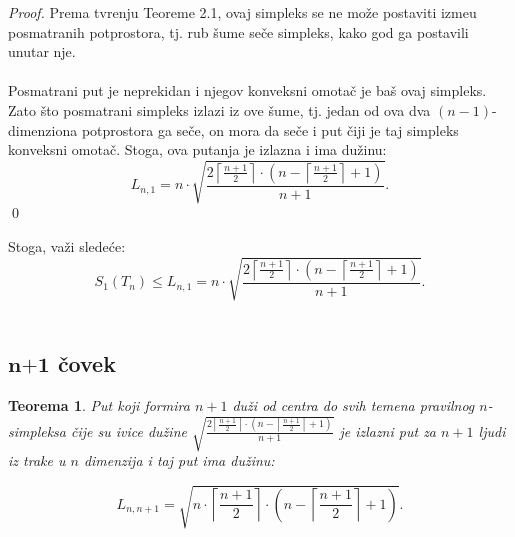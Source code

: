 \documentclass[11pt]{article}
\newtheorem{teo}{\bf Teorema}[section]
\begin{document}
\begin{proof}
Prema tvr\dj enju Teoreme 2.1, ovaj simpleks se ne mo\v ze postaviti izme\dj u posmatranih potprostora, tj. rub \v sume se\v ce simpleks, kako god ga postavili unutar nje.
\\
\\
\indent Posmatrani put je neprekidan i njegov konveksni omota\v c je ba\v s ovaj simpleks. Zato \v sto posmatrani simpleks izlazi iz ove \v sume, tj. jedan od ova dva $(n-1)$-dimenziona potprostora ga se\v ce, on mora da se\v ce i put \v ciji je taj simpleks konveksni omota\v c. Stoga, ova putanja je izlazna i ima du\v zinu:
\\
$$L_{n,1}=n\cdot \sqrt{\frac{2\left\lceil \frac{n+1}{2}\right\rceil\cdot \left( n-\left\lceil\frac{n+1}{2}\right\rceil+1\right)}{n+1}}. $$ \qed
\end{proof}
\indent Stoga, va\v zi slede\' ce:
$$S_1(T_n)\leqslant L_{n, 1}=n\cdot \sqrt{\frac{2\left\lceil \frac{n+1}{2}\right\rceil\cdot \left( n-\left\lceil\frac{n+1}{2}\right\rceil+1\right)}{n+1}}.$$
\\
\subsection[$\textbf{n+1}$ \v covek]{$\textbf{n+1}$ \v covek} 
\bigskip
\begin{teo} Put koji formira $n+1$ du\v zi od centra do svih temena pravilnog $n$-simpleksa  \v cije su ivice du\v zine $\sqrt{\frac{2\left\lceil \frac{n+1}{2}\right\rceil\cdot \left( n-\left\lceil\frac{n+1}{2}\right\rceil+1\right)}{n+1}}$ je izlazni put za $n+1$ ljudi iz trake u $n$ dimenzija i taj put ima du\v zinu:

$$L_{n,n+1}=\sqrt{n\cdot\left\lceil\frac{n+1}{2}\right\rceil\cdot\left( n-\left\lceil\frac{n+1}{2}\right\rceil+1\right)}.$$\end{teo}
\end{document}
